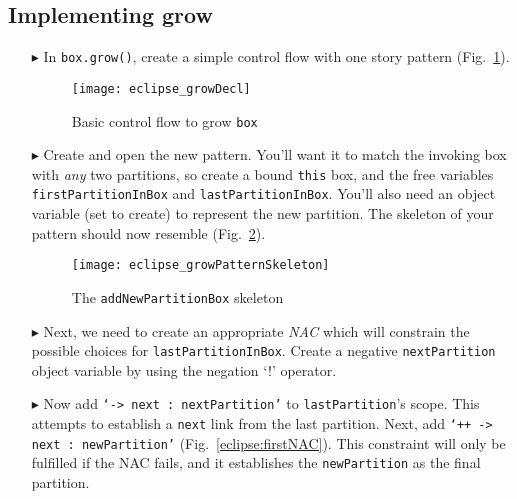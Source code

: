 \clearpage
\hypertarget{growBox tex}{}
\subsection{Implementing grow}
\texHeader

\vspace*{0.5cm}

\begin{itemize}

\item[$\blacktriangleright$] In \texttt{box.grow()}, create a simple control flow with one story pattern (Fig.~\ref{eclipse:growDecl}). 

\begin{figure}[htbp]
\begin{center}
  \texttt{[image: eclipse\_growDecl]}
  \caption{Basic control flow to grow \texttt{box}}
  \label{eclipse:growDecl}
\end{center}
\end{figure}

\item[$\blacktriangleright$] Create and open the new pattern. You'll want it to match the invoking box with \emph{any} two partitions, so create a bound
\texttt{this} box, and the free variables \texttt{firstPartitionInBox} and \texttt{lastPartitionInBox}. You'll also need an object variable (set to create) to
represent the new partition. The skeleton of your pattern should now resemble (Fig.~\ref{eclipse:growPattSkel}).

\vspace{0.5cm}

\begin{figure}[htbp]
\begin{center}
  \texttt{[image: eclipse\_growPatternSkeleton]}
  \caption{The \texttt{addNewPartitionBox} skeleton}
  \label{eclipse:growPattSkel}
\end{center}
\end{figure}

\item[$\blacktriangleright$] Next, we need to create an appropriate \emph{NAC} which will constrain the possible choices for \texttt{lastPartitionInBox}.
Create a negative \texttt{next\-Part\-it\-ion} object variable by using the negation `!' operator.

\vspace{0.5cm}

\item[$\blacktriangleright$] Now add \texttt{`-> next : nextPartition'} to \texttt{lastPartition}'s scope. This attempts to establish a \texttt{next} link from
the last partition. Next, add \texttt{`++ -> next : newPartition'} (Fig.~\ref{eclipse:firstNAC}). This constraint will only be fulfilled if the NAC fails, and
it establishes the \texttt{newPartition} as the final partition.


\end{itemize}
